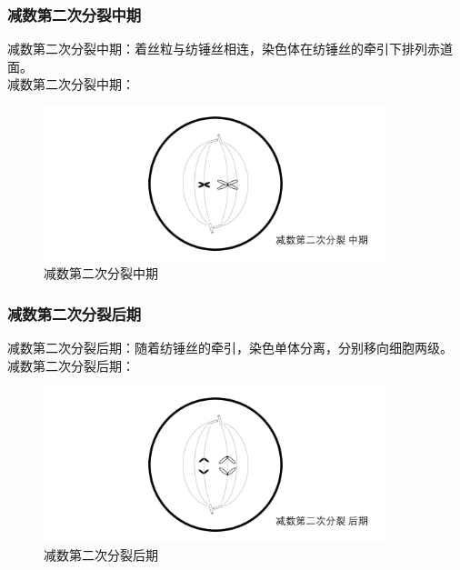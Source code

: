 \documentclass[UTF8]{ctexart}
\begin{document}
\subsubsection{减数第二次分裂中期}
    减数第二次分裂中期：着丝粒与纺锤丝相连，染色体在纺锤丝的牵引下排列赤道面。\\[4mm]
    减数第二次分裂中期：
    \begin{figure}[h]
        \begin{center}
            \includegraphics[width=10cm]{BiologyImage/41.jpg}
            \caption{减数第二次分裂中期}
        \end{center}
    \end{figure}

\subsubsection{减数第二次分裂后期}
    减数第二次分裂后期：随着纺锤丝的牵引，染色单体分离，分别移向细胞两级。\\[4mm]
    减数第二次分裂后期：
    \begin{figure}[h]
        \begin{center}
            \includegraphics[width=10cm]{BiologyImage/42.jpg}
            \caption{减数第二次分裂后期}
        \end{center}
    \end{figure}

\newpage
\end{document}
